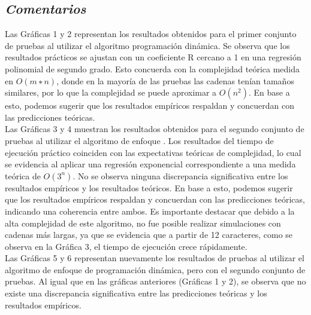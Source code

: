 \subsection{\textit{\textbf{Comentarios}}}

Las Gráficas 1 y 2 representan los resultados obtenidos para el primer conjunto de pruebas al utilizar el algoritmo programación dinámica. Se observa que los resultados prácticos se ajustan con un coeficiente R cercano a 1 en una regresión polinomial de segundo grado. Esto concuerda con la complejidad teórica medida en \(O(m∗n)\), donde en la mayoría de las pruebas las cadenas tenían tamaños similares, por lo que la complejidad se puede aproximar a \(O(n^{2})\). En base a esto, podemos sugerir que los resultados empíricos respaldan y concuerdan con las predicciones teóricas.\\

Las Gráficas 3 y 4 muestran los resultados obtenidos para el segundo conjunto de pruebas al utilizar el algoritmo de enfoque . Los resultados del tiempo de ejecución práctico coinciden con las expectativas teóricas de complejidad, lo cual se evidencia al aplicar una regresión exponencial correspondiente a una medida teórica de \(O(3^{n})\). No se observa ninguna discrepancia significativa entre los resultados empíricos y los resultados teóricos. En base a esto, podemos sugerir que los resultados empíricos respaldan y concuerdan con las predicciones teóricas, indicando una coherencia entre ambos. Es importante destacar que debido a la alta complejidad de este algoritmo, no fue posible realizar simulaciones con cadenas más largas, ya que se evidencia que a partir de 12 caracteres, como se observa en la Gráfica 3, el tiempo de ejecución crece rápidamente.\\

Las Gráficas 5 y 6 representan nuevamente los resultados de pruebas al utilizar el algoritmo de enfoque de programación dinámica, pero con el segundo conjunto de pruebas. Al igual que en las gráficas anteriores (Gráficas 1 y 2), se observa que no existe una discrepancia significativa entre las predicciones teóricas y los resultados empíricos.\\